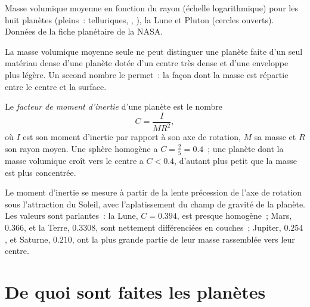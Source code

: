 \begin{omfigure}
{\small Masse volumique moyenne en fonction du rayon (échelle logarithmique)
pour les huit planètes (pleins~: telluriques, , ), la Lune et Pluton (cercles ouverts). Données de la fiche planétaire de
la NASA.}
\end{omfigure}

La masse volumique moyenne seule ne peut distinguer une planète faite d'un seul
matériau dense d'une planète dotée d'un centre très dense et d'une enveloppe
plus légère. Un second nombre le permet~: la façon dont la masse est répartie
entre le centre et la surface.

\begin{definition}\label{def:b1:comparative-planetology:moi}
Le \emph{facteur de moment d'inertie} d'une
planète est le nombre
\[
  C = \frac{I}{MR^2} ,
\]
où $I$ est son moment d'inertie par rapport à son axe de rotation, $M$ sa masse
et $R$ son rayon moyen. Une sphère homogène a $C = \tfrac25 = 0.4$~; une planète
dont la masse volumique croît vers le centre a $C < 0.4$, d'autant plus petit
que la masse est plus concentrée.
\end{definition}

Le moment d'inertie se mesure à partir de la lente précession de l'axe de
rotation sous l'attraction du Soleil, avec l'aplatissement du champ de gravité
de la planète. Les valeurs sont parlantes~: la Lune, $C = 0.394$, est presque
homogène~; Mars, $0.366$, et la Terre, $0.3308$, sont nettement différenciées en
couches~; Jupiter, $0.254$, et Saturne, $0.210$, ont la plus grande partie de
leur masse rassemblée vers leur centre.

\section{De quoi sont faites les planètes}


